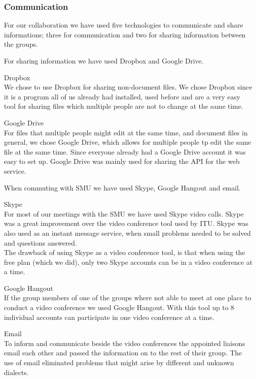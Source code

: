 \subsubsection{Communication}
For our collaboration we have used five technologies to communicate and share informations; three for communication and two for sharing information between the groups.

For sharing information we have used Dropbox and Google Drive. \vspace{-5mm}
\begin{description}
	\item Dropbox \\
		We chose to use Dropbox for sharing non-document files. We chose Dropbox since it is a program all of us already had installed, used before and are a very easy tool for sharing files which multiple people are not to change at the same time.
	\item Google Drive \\
		For files that multiple people might edit at the same time, and document files in general, we chose Google Drive, which allows for multiple people tp edit the same file at the same time. Since everyone already had a Google Drive account it was easy to set up.
		Google Drive was mainly used for sharing the API for the web service.
\end{description}

When commuting with SMU we have used Skype, Google Hangout and email.
\begin{description}
	\item Skype \\
		For most of our meetings with the SMU we have used Skype video calls. Skype was a great improvement over the video conference tool used by ITU.
		Skype was also used as an instant message service, when small problems needed to be solved and questions answered. \\
		The drawback of using Skype as a video conference tool, is that when using the free plan (which we did), only two Skype accounts can be in a video conference at a time.
	\item Google Hangout \\
		If the group members of one of the groups where not able to meet at one place to conduct a video conference we used Google Hangout. With this tool up to 8 individual accounts can participate in one video conference at a time.
	\item Email \\
		To inform and communicate beside the video conferences the appointed liaisons email each other and passed the information on to the rest of their group.
		The use of email eliminated problems that might arise by different and unknown dialects.
\end{description}